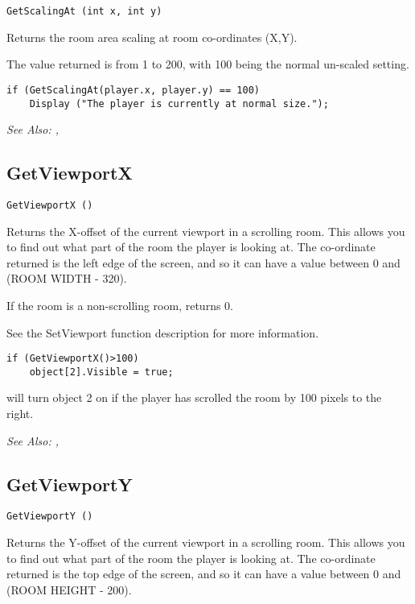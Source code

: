 \begin{verbatim}
GetScalingAt (int x, int y)
\end{verbatim}
Returns the room area scaling at room co-ordinates (X,Y).

The value returned is from 1 to 200, with 100 being the normal un-scaled setting.

\begin{verbatim}
if (GetScalingAt(player.x, player.y) == 100)
    Display ("The player is currently at normal size.");
\end{verbatim}

\it{See Also:} , 



\subsection{GetViewportX}\label{GetViewportX}%

\begin{verbatim}
GetViewportX ()
\end{verbatim}
Returns the X-offset of the current viewport in a scrolling room. This
allows you to find out what part of the room the player is looking at.
The co-ordinate returned is the left edge of the screen, and so it can
have a value between 0 and (ROOM WIDTH - 320).

If the room is a non-scrolling room, returns 0.

See the SetViewport function description for more information.

\begin{verbatim}
if (GetViewportX()>100)
    object[2].Visible = true;
\end{verbatim}
will turn object 2 on if the player has scrolled the room by 100 pixels to the right.

\it{See Also:} , 

\subsection{GetViewportY}\label{GetViewportY}%

\begin{verbatim}
GetViewportY ()
\end{verbatim}
Returns the Y-offset of the current viewport in a scrolling room. This
allows you to find out what part of the room the player is looking at.
The co-ordinate returned is the top edge of the screen, and so it can
have a value between 0 and (ROOM HEIGHT - 200).


